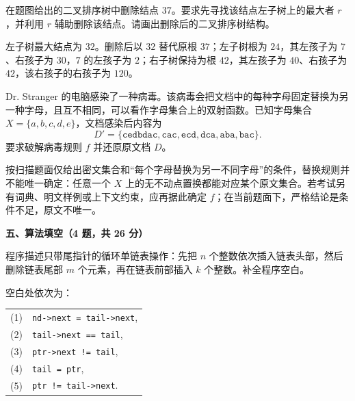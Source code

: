 \begin{question}
在题图给出的二叉排序树中删除结点 $37$。要求先寻找该结点左子树上的最大者 $r$，并利用 $r$ 辅助删除该结点。请画出删除后的二叉排序树结构。

\begin{solution}
左子树最大结点为 $32$。删除后以 $32$ 替代原根 $37$；左子树根为 $24$，其左孩子为 $7$、右孩子为 $30$，$7$ 的左孩子为 $2$；右子树保持为根 $42$，其左孩子为 $40$、右孩子为 $42$，该右孩子的右孩子为 $120$。
\end{solution}
\end{question}

\begin{question}
Dr. Stranger 的电脑感染了一种病毒。该病毒会把文档中的每种字母固定替换为另一种字母，且互不相同，可以看作字母集合上的双射函数。已知字母集合 $X=\{a,b,c,d,e\}$，文档感染后内容为
\[
D'=\{\texttt{cedbdac},\texttt{cac},\texttt{ecd},\texttt{dca},\texttt{aba},\texttt{bac}\}.
\]
要求破解病毒规则 $f$ 并还原原文档 $D$。
\begin{solution}
按扫描题面仅给出密文集合和“每个字母替换为另一不同字母”的条件，替换规则并不能唯一确定：任意一个 $X$ 上的无不动点置换都能对应某个原文集合。若考试另有词典、明文样例或上下文约束，应再据此确定 $f$；在当前题面下，严格结论是条件不足，原文不唯一。
\end{solution}
\end{question}

\textbf{五、算法填空（4 题，共 26 分）}
\begin{question}[只带尾指针的循环单链表]
程序描述只带尾指针的循环单链表操作：先把 $n$ 个整数依次插入链表头部，然后删除链表尾部 $m$ 个元素，再在链表前部插入 $k$ 个整数。补全程序空白。
\begin{solution}
空白处依次为：
\begin{center}
\small
\begin{tabular}{@{}r l@{}}
(1)&\texttt{nd->next = tail->next},\\
(2)&\texttt{tail->next == tail},\\
(3)&\texttt{ptr->next != tail},\\
(4)&\texttt{tail = ptr},\\
(5)&\texttt{ptr != tail->next}.
\end{tabular}
\end{center}
\end{solution}
\end{question}


